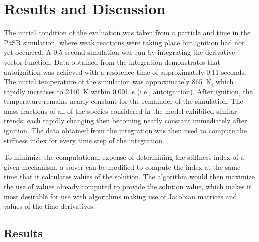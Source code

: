 \documentclass[12pt]{ussci}
\begin{document}
\section{Results and Discussion}
%
The initial condition of the evaluation was taken from a particle and time in the PaSR simulation, where weak reactions were taking place but ignition had not yet occurred.
A 0.5 second simulation was run by integrating the derivative vector function.
Data obtained from the integration demonstrates that autoignition was achieved with a residence time of approximately 0.11 seconds.
The initial temperature of the simulation was approximately \SI{865}{\kelvin}, which rapidly increases to \SI{2440}{\kelvin} within \SI{0.001}{\second} (i.e., autoignition).
After ignition, the temperature remains nearly constant for the remainder of the simulation. The mass fractions of all of the species considered in the model exhibited similar trends; each rapidly changing then becoming nearly constant immediately after ignition.
The data obtained from the integration was then used to compute the stiffness index for every time step of the integration.

To minimize the computational expense of determining the stiffness index of a given mechanism, a solver can be modified to compute the index at the same time that it calculates values of the solution.
The algorithm would then maximize the use of values already computed to provide the solution value, which makes it most desirable for use with algorithms making use of Jacobian matrices and values of the time derivatives.

\subsection{Results}
\end{document}
